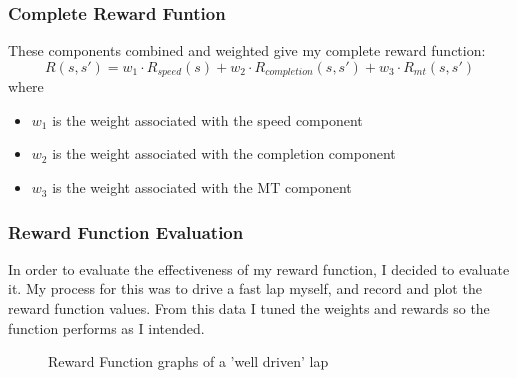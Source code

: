 \subsubsection{Complete Reward Funtion}
These components combined and weighted give my complete reward function:
\[
R(s,s') = w_1 \cdot R_{speed}(s) + w_2 \cdot R_{completion}(s,s') + w_3 \cdot R_{mt}(s,s')
\]
where
\begin{itemize}
    \item $w_1$ is the weight associated with the speed component
    \item $w_2$ is the weight associated with the completion component
    \item $w_3$ is the weight associated with the MT component
\end{itemize}
\subsubsection{Reward Function Evaluation}
In order to evaluate the effectiveness of my reward function, I decided to evaluate it. My process for this was to drive a fast lap myself, and record and plot the reward function values. From this data I tuned the weights and rewards so the function performs as I intended.
\begin{figure}[ht]
    \centering
    \hfill
    \caption{Reward Function graphs of a 'well driven' lap}
\end{figure}
